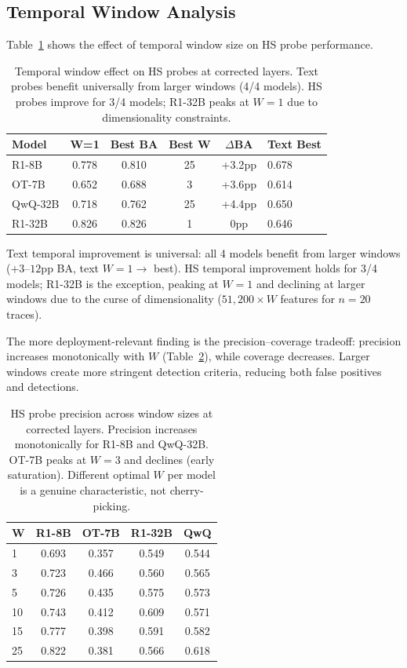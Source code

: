 \documentclass[11pt,a4paper]{article}
\newcommand{\pp}{\text{pp}}
\begin{document}
\subsection{Temporal Window Analysis}
\label{sec:temporal}

Table~\ref{tab:temporal} shows the effect of temporal window size on HS probe performance.

\begin{table}[t]
\centering
\small
\begin{tabular}{lccccl}
\toprule
\textbf{Model} & \textbf{W=1} & \textbf{Best BA} & \textbf{Best W} & \textbf{$\Delta$BA} & \textbf{Text Best} \\
\midrule
R1-8B & 0.778 & 0.810 & 25 & +3.2$\pp$ & 0.678 \\
OT-7B & 0.652 & 0.688 & 3 & +3.6$\pp$ & 0.614 \\
QwQ-32B & 0.718 & 0.762 & 25 & +4.4$\pp$ & 0.650 \\
R1-32B & 0.826 & 0.826 & 1 & 0$\pp$ & 0.646 \\
\bottomrule
\end{tabular}
\caption{Temporal window effect on HS probes at corrected layers. Text probes benefit universally from larger windows (4/4 models). HS probes improve for 3/4 models; R1-32B peaks at $W=1$ due to dimensionality constraints.}
\label{tab:temporal}
\end{table}

Text temporal improvement is universal: all 4 models benefit from larger windows ($+3$--$12\pp$ BA, text $W=1 \to$ best).
HS temporal improvement holds for 3/4 models; R1-32B is the exception, peaking at $W=1$ and declining at larger windows due to the curse of dimensionality ($51{,}200 \times W$ features for $n=20$ traces).

The more deployment-relevant finding is the precision--coverage tradeoff: precision increases monotonically with $W$ (Table~\ref{tab:w-ablation}), while coverage decreases.
Larger windows create more stringent detection criteria, reducing both false positives and detections.

\begin{table}[t]
\centering
\small
\begin{tabular}{lcccc}
\toprule
\textbf{W} & \textbf{R1-8B} & \textbf{OT-7B} & \textbf{R1-32B} & \textbf{QwQ} \\
\midrule
1 & 0.693 & 0.357 & 0.549 & 0.544 \\
3 & 0.723 & 0.466 & 0.560 & 0.565 \\
5 & 0.726 & 0.435 & 0.575 & 0.573 \\
10 & 0.743 & 0.412 & 0.609 & 0.571 \\
15 & 0.777 & 0.398 & 0.591 & 0.582 \\
25 & 0.822 & 0.381 & 0.566 & 0.618 \\
\bottomrule
\end{tabular}
\caption{HS probe precision across window sizes at corrected layers. Precision increases monotonically for R1-8B and QwQ-32B. OT-7B peaks at $W=3$ and declines (early saturation). Different optimal $W$ per model is a genuine characteristic, not cherry-picking.}
\label{tab:w-ablation}
\end{table}
\end{document}
